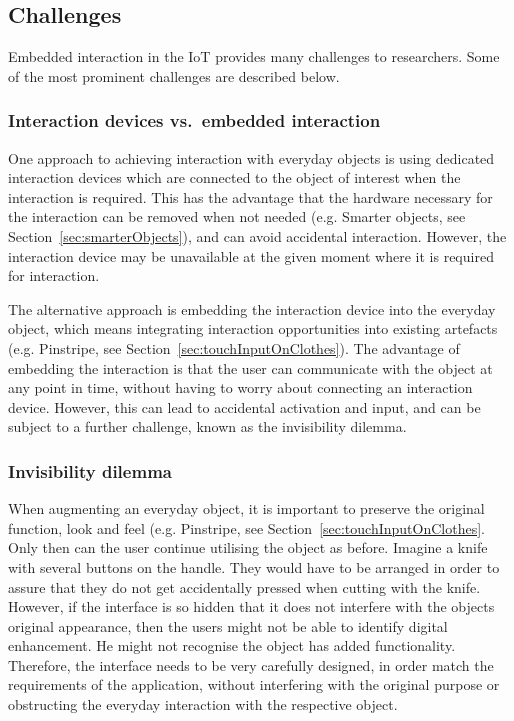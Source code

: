 \subsection{Challenges}
\label{sec:challenges}
Embedded interaction in the IoT provides many challenges to researchers. Some of the most prominent challenges are described below.

\subsubsection{Interaction devices vs.\ embedded interaction}
One approach to achieving interaction with everyday objects is using dedicated interaction devices which are connected to the object of interest when the interaction is required.
This has the advantage that the hardware necessary for the interaction can be removed when not needed (e.g. Smarter objects, see Section~\ref{sec:smarterObjects}), and can avoid accidental interaction. 
However, the interaction device may be unavailable at the given moment where it is required for interaction.

The alternative approach is embedding the interaction device into the everyday object, which means integrating interaction opportunities into existing artefacts (e.g. Pinstripe, see Section~\ref{sec:touchInputOnClothes}). 
The advantage of embedding the interaction is that the user can communicate with the object at any point in time, without having to worry about connecting an interaction device.
However, this can lead to accidental activation and input, and can be subject to a further challenge, known as the invisibility dilemma.

\subsubsection{Invisibility dilemma}
When augmenting an everyday object, it is important to preserve the original function, look and feel (e.g. Pinstripe, see Section~\ref{sec:touchInputOnClothes}.
Only then can the user continue utilising the object as before. Imagine a knife with several buttons on the handle. They would have to be arranged in order to assure that they do not get accidentally pressed when cutting with the knife.
However, if the interface is so hidden that it does not interfere with the objects original appearance, then the users might not be able to identify digital enhancement.
He might not recognise the object has added functionality.
Therefore, the interface needs to be very carefully designed, in order match the requirements of the application, without interfering with the original purpose or obstructing the everyday interaction with the respective object.

